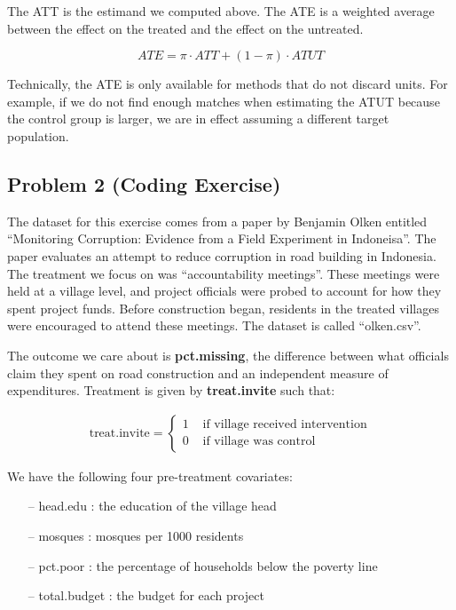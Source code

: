 \documentclass[]{tufte-handout}
\begin{document}
\begin{itemize}
The ATT is the estimand we computed above. The ATE is a weighted average between the effect on the treated and the effect on the untreated.

$$ ATE = \pi \cdot ATT + (1-\pi) \cdot ATUT $$

Technically, the ATE is only available for methods that do not discard units. For example, if we do not find enough matches when estimating the ATUT because the control group is larger, we are in effect assuming a different target population. 

\end{itemize}

\hypertarget{problem-2-coding-exercise}{%
\subsection{Problem 2 (Coding
Exercise)}\label{problem-2-coding-exercise}}

The dataset for this exercise comes from a paper by Benjamin Olken
entitled ``Monitoring Corruption: Evidence from a Field Experiment in
Indoneisa''. The paper evaluates an attempt to reduce corruption in road
building in Indonesia. The treatment we focus on was ``accountability
meetings''. These meetings were held at a village level, and project
officials were probed to account for how they spent project funds.
Before construction began, residents in the treated villages were
encouraged to attend these meetings. The dataset is called
``olken.csv''.

The outcome we care about is \textbf{pct.missing}, the difference
between what officials claim they spent on road construction and an
independent measure of expenditures. Treatment is given by
\textbf{treat.invite} such that:

\begin{align*}
  \text{treat.invite} = 
    \begin{cases}
      1 &\mbox{ if village received intervention} \\
      0 &\mbox{ if village was control }
    \end{cases}
\end{align*}

We have the following four pre-treatment covariates:

\begin{itemize}
  \item[--] head.edu : the education of the village head
  \item[--] mosques : mosques per 1000 residents
  \item[--] pct.poor : the percentage of households below the poverty line
  \item[--] total.budget : the budget for each project
\end{itemize}
\end{document}
